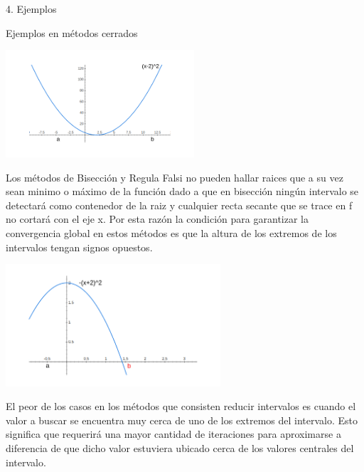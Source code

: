 \documentclass[11pt]{article}
\begin{document}
\vspace{1cm}
\begin{center} \Large {4. Ejemplos} \end{center}
{\large Ejemplos en métodos cerrados}
\begin{center}
    \includegraphics[keepaspectratio, width=7cm]{Problema_MetodoAbierto1.png}
    \caption{\\}
\end{center}   
Los métodos de Bisección y Regula Falsi no pueden hallar raices que a su vez sean minimo o máximo de la función dado a que en bisección ningún intervalo se detectará como contenedor de la raiz y cualquier recta secante que se trace en f no cortará con el eje x. Por esta razón la condición para garantizar la convergencia global en estos métodos es que la altura de los extremos de los intervalos tengan signos opuestos.


\begin{center}
    \includegraphics[keepaspectratio, width=8cm]{Problema_MetodoAbierto2.png}
    \caption{\\}
\end{center}   
El peor de los casos en los métodos que consisten reducir intervalos es cuando el valor a buscar se encuentra muy cerca de uno de los extremos del intervalo. Esto significa que requerirá una mayor cantidad de iteraciones para aproximarse a diferencia de que dicho valor estuviera ubicado cerca de los valores centrales del intervalo.
\end{document}
